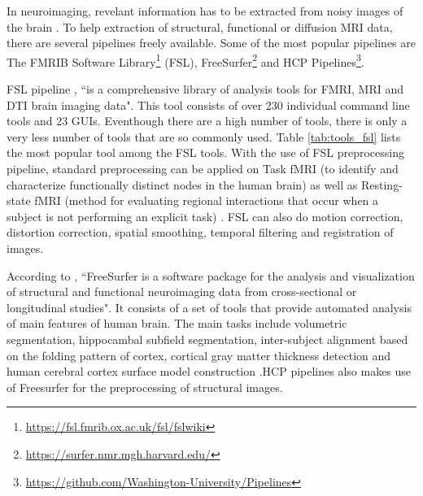 In neuroimaging, revelant information has to be extracted from noisy images of the brain \cite{WOOLRICH2009S173}. To help extraction of structural, functional or diffusion MRI data, there are several pipelines freely available. Some of the most popular pipelines are The FMRIB Software Library\footnote{\url{https://fsl.fmrib.ox.ac.uk/fsl/fslwiki}} (FSL), FreeSurfer\footnote{\url{https://surfer.nmr.mgh.harvard.edu/}} and HCP Pipelines\footnote{\url{https://github.com/Washington-University/Pipelines}}.

FSL pipeline \cite{JENKINSON2012782}, ``is a comprehensive library of analysis tools for FMRI, MRI and DTI brain imaging data". This tool consists of over 230 individual command line tools and 23 GUIs. Eventhough there are a high number of tools, there is only a very less number of tools that are so commonly used. Table \ref{tab:tools_fsl} lists the most popular tool among the FSL tools. With the use of FSL preprocessing pipeline, standard preprocessing can be applied on Task fMRI (to identify and characterize functionally distinct nodes in the human brain) as well as Resting-state fMRI (method for evaluating regional interactions that occur when a subject is not performing an explicit task) \cite{hcp_protocol} \cite{FSL}. FSL can also do motion correction, distortion correction, spatial smoothing, temporal filtering and registration of images.

According to \cite{freesurfer_website}, ``FreeSurfer is a software package for the analysis and visualization of structural and functional neuroimaging data from cross-sectional or longitudinal studies". It consists of a set of tools that provide automated analysis of main features of human brain. The main tasks include volumetric segmentation, hippocambal subfield segmentation, inter-subject alignment based on the folding pattern of cortex, cortical gray matter thickness detection and human cerebral cortex surface model construction \cite{Fischl2012}.HCP pipelines also makes use of Freesurfer for the preprocessing of structural images.

